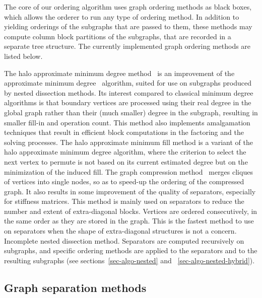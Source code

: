 The core of our ordering algorithm uses graph ordering methods as
black boxes, which allows the orderer to run any type of ordering
method. In addition to yielding orderings of the subgraphs that are
passed to them, these methods may compute column block partitions of
the subgraphs, that are recorded in a separate tree structure.
The currently implemented graph ordering methods are listed below.
\begin{itemize}
The halo approximate minimum degree method~\cite{peroam99} is an
improvement of the approximate minimum degree~\cite{amdadu96}
algorithm, suited for use on subgraphs produced by nested dissection
methods. Its interest compared to classical minimum degree algorithms
is that boundary vertices are processed using their real degree in the
global graph rather than their (much smaller) degree in the subgraph,
resulting in smaller fill-in and operation count. This method also
implements amalgamation techniques that result in efficient block
computations in the factoring and the solving processes.
The halo approximate minimum fill method is a variant of the
halo approximate minimum degree algorithm, where the criterion to
select the next vertex to permute is not based on its current
estimated degree but on the minimization of the induced fill.
The graph compression method~\cite{ashc95} merges cliques of vertices
into single nodes, so as to speed-up the ordering of the compressed
graph. It also results in some improvement of the quality of
separators, especially for stiffness matrices.
This method is mainly used on separators to reduce the number and
extent of extra-diagonal blocks.
Vertices are ordered consecutively, in the same order as they are
stored in the graph. This is the fastest method to use on separators
when the shape of extra-diagonal structures is not a concern.
Incomplete nested dissection method. Separators are computed
recursively on subgraphs, and specific ordering methods are applied to
the separators and to the resulting subgraphs (see
sections~\ref{sec-algo-nested} and ~\ref{sec-algo-nested-hybrid}).
\end{itemize}

\subsection{Graph separation methods}

